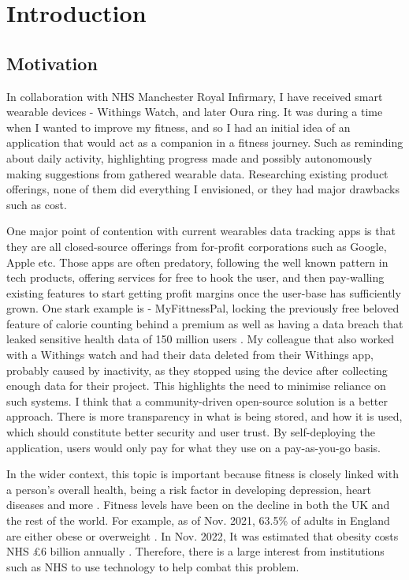\chapter{Introduction}
\label{cha:intro}

\section{Motivation}
\par
In collaboration with NHS Manchester Royal Infirmary, I have received smart wearable devices - Withings Watch,
and later Oura ring. It was during a time when I wanted to improve my fitness, and so I had an initial idea of an
application that would act as a companion in a fitness journey. Such as reminding about daily activity, highlighting progress made and
possibly autonomously making suggestions from gathered wearable data. Researching existing product offerings, none of them 
did everything I envisioned, or they had major drawbacks such as cost.
\par One major point of contention with current wearables data tracking apps is that they are all closed-source offerings
 from for-profit corporations such as Google, Apple etc.
 Those apps are often predatory, following the well known pattern in tech products, offering
 services for free to hook the user, and then pay-walling existing features to start getting profit margins once the user-base has sufficiently grown. 
 One stark example is - MyFittnessPal, locking the previously free beloved feature of 
 calorie counting behind a premium \cite{myfitnesspalPaywall} as well as having a data breach that leaked sensitive health data of 150 million users \cite{myFitnessPalDataBreach}.
 My colleague that also worked with a Withings watch and had their data deleted from their Withings app, probably caused by inactivity, as they stopped using the device after collecting enough data for their project. 
 This highlights the need to minimise reliance on such systems. I think that a community-driven open-source solution is a better approach. 
 There is more transparency in what is being stored, and how it is used, which should constitute better security and 
 user trust. By self-deploying the application, users would only pay for what they use on a pay-as-you-go basis. 
\par
In the wider context, this topic is important because fitness is closely linked with a person's overall health, being a risk factor in developing depression, heart diseases and more \cite{nhsObesity}. 
Fitness levels have been on the decline in both the UK and the rest of the world.
For example, as of Nov. 2021, 63.5\% of adults in England are either obese or overweight \cite{ukObesity2023Survey}. 
In Nov. 2022, It was estimated that obesity costs NHS £6 billion annually \cite{nhsObesityCost}.
Therefore, there is a large interest from institutions such as NHS to use technology to help combat this problem.


